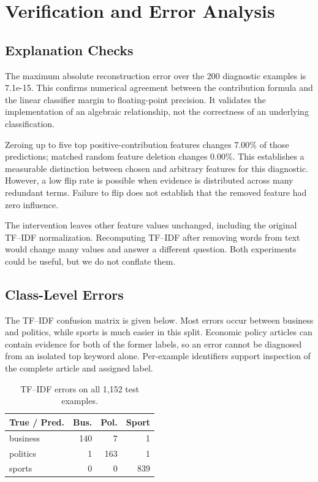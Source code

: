 \documentclass[11pt]{article}
\begin{document}
\section{Verification and Error Analysis}
\subsection{Explanation Checks}
The maximum absolute reconstruction error over the 200 diagnostic examples is 7.1e-15. This confirms numerical agreement between the contribution formula and the linear classifier margin to floating-point precision. It validates the implementation of an algebraic relationship, not the correctness of an underlying classification.

Zeroing up to five top positive-contribution features changes 7.00\% of those predictions; matched random feature deletion changes 0.00\%. This establishes a measurable distinction between chosen and arbitrary features for this diagnostic. However, a low flip rate is possible when evidence is distributed across many redundant terms. Failure to flip does not establish that the removed feature had zero influence.

The intervention leaves other feature values unchanged, including the original TF--IDF normalization. Recomputing TF--IDF after removing words from text would change many values and answer a different question. Both experiments could be useful, but we do not conflate them.

\subsection{Class-Level Errors}
The TF--IDF confusion matrix is given below. Most errors occur between business and politics, while sports is much easier in this split. Economic policy articles can contain evidence for both of the former labels, so an error cannot be diagnosed from an isolated top keyword alone. Per-example identifiers support inspection of the complete article and assigned label.

\begin{table}[h]\centering\small
\begin{tabular}{lrrr}\toprule
True / Pred. & Bus. & Pol. & Sport\\\midrule
business & 140 & 7 & 1 \\
politics & 1 & 163 & 1 \\
sports & 0 & 0 & 839 \\
\bottomrule\end{tabular}
\caption{TF--IDF errors on all 1,152 test examples.}
\end{table}
\end{document}
